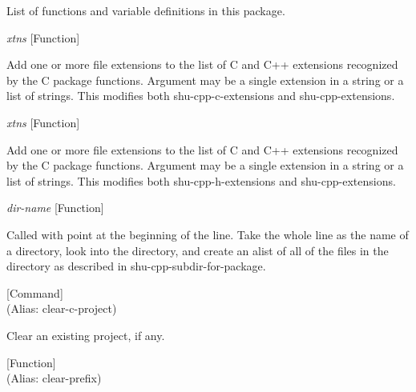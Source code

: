 List of functions and variable definitions in this package.



\vspace{1em}
\noindent
{}
\usebox{\funcname}\emph{xtns}
 \hfill [Function]

\begin{doc-string}
Add one or more file extensions to the list of C and C++ extensions recognized by the
C package functions.  Argument may be a single extension in a string or a list of strings.
This modifies both shu-cpp-c-extensions and shu-cpp-extensions.
\end{doc-string}

\vspace{1em}
\noindent
{}
\usebox{\funcname}\emph{xtns}
 \hfill [Function]

\begin{doc-string}
Add one or more file extensions to the list of C and C++ extensions recognized by the
C package functions.  Argument may be a single extension in a string or a list of strings.
This modifies both shu-cpp-h-extensions and shu-cpp-extensions.
\end{doc-string}

\vspace{1em}
\noindent
{}
\usebox{\funcname}\emph{dir-name}
 \hfill [Function]

\begin{doc-string}
Called with point at the beginning of the line.  Take the whole line as the
name of a directory, look into the directory, and create an alist of all of the
files in the directory as described in shu-cpp-subdir-for-package.
\end{doc-string}

\vspace{1em}
\noindent
{}
\usebox{\funcname}
 \hfill [Command]\\%
 (Alias: clear-c-project)

\begin{doc-string}
Clear an existing project, if any.
\end{doc-string}

\vspace{1em}
\noindent
{}
\usebox{\funcname}
 \hfill [Function]\\%
 (Alias: clear-prefix)

